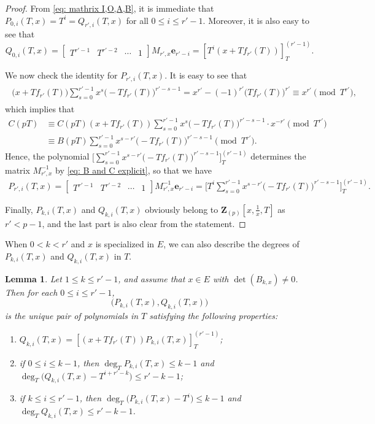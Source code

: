 \documentclass[11pt]{amsart}
\theoremstyle{definition}
\numberwithin{equation}{subsection}
\theoremstyle{plain}
\theoremstyle{plain}
\theoremstyle{plain}
\theoremstyle{plain}
\theoremstyle{plain}
\theoremstyle{plain}
\theoremstyle{plain}
\theoremstyle{plain}
\theoremstyle{plain}
\newtheorem{lemm}[equation]{Lemma}
\theoremstyle{plain}
\theoremstyle{plain}
\theoremstyle{plain}
\theoremstyle{definition}
\theoremstyle{definition}
\theoremstyle{definition}
\theoremstyle{remark}
\renewcommand{\(}{\textup{(}}
\renewcommand{\)}{\textup{)}}
\newcommand{\Z}{\mathbf{Z}}
\begin{document}
\begin{proof}
From \eqref{eq: mathrix I,O,A,B}, it is immediate that $P_{0,i}(T,x)=T^i=Q_{r',i}(T,x)$ for all $0\leq i\leq r'-1$.
Moreover, it is also easy to see that $$Q_{0,i}(T,x)=
    \begin{bmatrix}
        T^{r'-1} & T^{r'-2} & \cdots & 1
    \end{bmatrix}
    M_{r',x}\mathbf{e}_{r'-i}=[T^i(x+Tf_{r'}(T))]_{T}^{(r'-1)}.$$

We now check the identity for $ P_{r',i}(T,x)$. It is easy to see that
\begin{align}\label{eq: elementry computation}
\begin{split}
\big(x+Tf_{r'}(T)\big)\sum_{s=0}^{r'-1}x^s\big(-Tf_{r'}(T)\big)^{r'-s-1}=x^{r'}-(-1)^{r'}\big(Tf_{r'}(T)\big)^{r'}\equiv x^{r'}\pmod{T^{r'}},
\end{split}
\end{align}
which implies that
\begin{align*}
    C(pT)
    &\equiv
    C(pT)(x+Tf_{r'}(T))\sum_{s=0}^{r'-1}x^s\big(-Tf_{r'}(T)\big)^{r'-s-1}\cdot x^{-r'}\pmod{T^{r'}}
    \\
    &\equiv
    B(pT)\sum_{s=0}^{r'-1}x^{s-r'}\big(-Tf_{r'}(T)\big)^{r'-s-1}    \pmod{T^{r'}}.
\end{align*}
Hence, the polynomial $\big[\sum_{s=0}^{r'-1}x^{s-r'}\big(-Tf_{r'}(T)\big)^{r'-s-1}\big]^{(r'-1)}_T$ determines the matrix $M_{r',x}^{-1}$ by \eqref{eq: B and C explicit}, so that we have
\begin{align*}
P_{r',i}(T,x)=
\begin{bmatrix}
        T^{r'-1} & T^{r'-2} & \cdots & 1
    \end{bmatrix}
    M_{r',x}^{-1}\mathbf{e}_{r'-i}=\bigg[T^i\sum_{s=0}^{r'-1}x^{s-r'}\big(-Tf_{r'}(T)\big)^{r'-s-1}\bigg]^{(r'-1)}_T.
\end{align*}

Finally, $P_{k,i}(T,x)$ and $Q_{k,i}(T,x)$ obviously belong to $\Z_{(p)}[x,\frac{1}{x},T]$ as $r'<p-1$, and the last part is also clear from the statement.
\end{proof}

When $0<k<r'$ and $x$ is specialized in $E$, we can also describe the degrees of $P_{k,i}(T,x)$ and $Q_{k,i}(T,x)$ in $T$.
\begin{lemm}\label{lemma: PQdegree}
Let $1\leq k\leq r'-1$, and assume that $x\in E$ with $\det (B_{k,x})\neq 0$. Then for each $0\leq i\leq r'-1$, $$\big(P_{k,i}(T,x),Q_{k,i}(T,x)\big)$$ is the unique pair of polynomials in $T$ satisfying the following properties:
    \begin{enumerate}[leftmargin=*]
        \item $Q_{k,i}(T,x)=[(x+Tf_{r'}(T))P_{k,i}(T,x)]_{T}^{(r'-1)}$;
        \item if $0\leq i\leq k-1$, then $\deg_T P_{k,i}(T,x)\leq k-1$ and $\deg_T\big( Q_{k,i}(T,x)-T^{i+r'-k} \big)\leq r'-k-1$;
        \item if $k\leq i\leq r'-1$, then $\deg_T\big( P_{k,i}(T,x)-T^i \big)\leq k-1$ and $\deg_T Q_{k,i}(T,x)\leq r'-k-1$.
    \end{enumerate}
\end{lemm}
\end{document}
